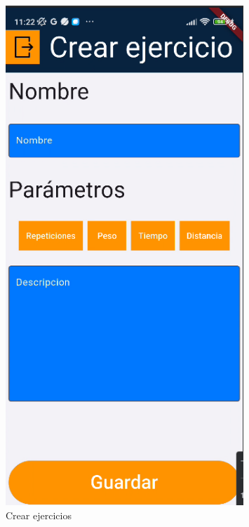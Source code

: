 \begin{figure}[H]
   \centering
    \includegraphics[width=0.8\textwidth]{pantallas/CrearEjercicio.png}
    \caption{Crear ejercicios}
    \label{fig:CrearEjers}
\end{figure}

